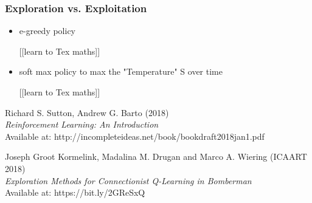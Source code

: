 \documentclass[12pt]{report}
\begin{document}
\subsubsection{Exploration vs. Exploitation}
\begin{itemize}
	\item e-greedy policy 
	
	[[learn to Tex maths]]
	\item soft max policy to max the "Temperature" S over time
	
	[[learn to Tex maths]]
\end{itemize}



\begin{thebibliography}{111}
   



Richard S. Sutton, Andrew G. Barto (2018)\\
\textit{Reinforcement Learning: An Introduction}\\
Available at: http://incompleteideas.net/book/bookdraft2018jan1.pdf

Joseph Groot Kormelink, Madalina M. Drugan and Marco A. Wiering (ICAART 2018)\\
\textit{Exploration Methods for Connectionist Q-Learning in Bomberman}\\
Available at: https://bit.ly/2GReSxQ
\end{thebibliography}
\end{document}
